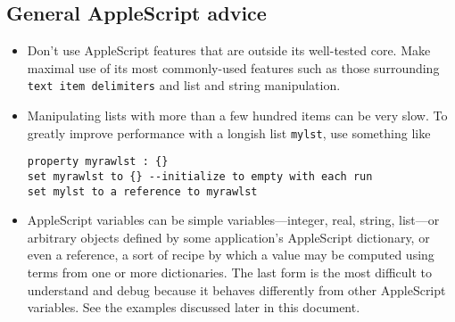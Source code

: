 \documentclass[11pt]{amsart}
\begin{document}
\subsection{General AppleScript advice}
\begin{itemize}
\item Don't use AppleScript features that are outside its well-tested core. Make maximal use of its most commonly-used features such as those surrounding {\tt text item delimiters} and list and string manipulation. 
\item
Manipulating lists with more than a few hundred items can be very slow. To greatly improve performance with a longish list {\tt mylst}, use something like
\begin{verbatim}
property myrawlst : {}
set myrawlst to {} --initialize to empty with each run
set mylst to a reference to myrawlst
\end{verbatim}
\item
AppleScript variables can be simple variables---integer, real, string, list---or arbitrary objects defined by some application's AppleScript dictionary, or even a reference,  a sort of recipe by which a value may be computed using terms from one or more dictionaries. The last form is the most difficult to understand and debug because it behaves differently from other AppleScript variables. See the examples discussed later in this document.
\end{itemize}
\end{document}
